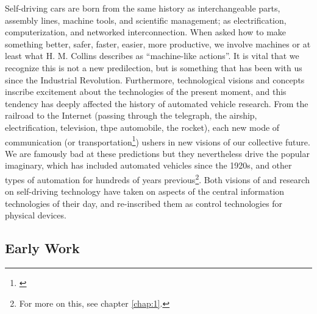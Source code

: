 Self-driving cars are born from the
same history as interchangeable parts, assembly lines, machine tools,
and scientific management; as electrification, computerization, and
networked interconnection. When asked how to make something better,
safer, faster, easier, more productive, we involve machines or at
least what H. M. Collins describes as ``machine-like actions''\cite{???}. It is
vital that we recognize this is not a new predilection, but is
something that has been with us since the Industrial Revolution.
Furthermore, technological visions and concepts inscribe excitement about the
technologies of the present moment, and this tendency has deeply
affected the history of automated vehicle research. From the railroad to the
Internet (passing through the telegraph, the airship, electrification,
television, thpe automobile, the rocket), each new mode of
communication (or transportation\footnote{\cite{???}}) ushers in new visions of our
collective future. We are famously bad at these predictions\cite{???} but they
nevertheless drive the popular imaginary, which has included automated
vehicles since the 1920s, and other types of automation for hundreds
of years previous\footnote{For more on this, see chapter
  \ref{chap:1}.}. Both visions of and research on self-driving
technology have taken on aspects of the central information
technologies of their day, and re-inscribed them as control
technologies for physical devices.

\subsection{Early Work}

